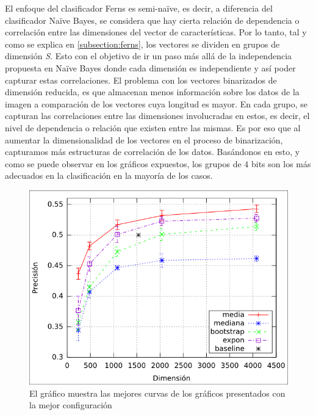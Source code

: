 	El enfoque del clasificador Ferns es semi-na\"{i}ve, es decir, a diferencia del clasificador Na\"{i}ve Bayes, se considera que hay cierta relación de dependencia o correlación entre las dimensiones del vector de características. Por lo tanto, tal y como se explica en \ref{subsection:ferns}, los vectores se dividen en grupos de dimensión \textit{S}. Esto con el objetivo de ir un paso más allá de la independencia propuesta en Na\"{i}ve Bayes donde cada dimensión es independiente y así poder capturar estas correlaciones. El problema con los vectores binarizados de dimensión reducida, es que almacenan menos información sobre los datos de la imagen a comparación de los vectores cuya longitud es mayor. En cada grupo, se capturan las correlaciones entre las dimensiones involucradas en estos, es decir, el nivel de dependencia o relación que existen entre las mismas. Es por eso que al aumentar la dimensionalidad de los vectores en el proceso de binarización, capturamos más estructuras de correlación de los datos. Basándonos en esto, y como se puede observar en los gráficos expuestos, los grupos de $4$ bits son los más adecuados en la clasificación en la mayoría de los casos.

			\begin{figure}[htbp]
				\centering
				\centerline{
					\includegraphics[scale=0.6]{img/resultados/reales/comparativa_metodos.png}
				}
				\caption[Reales comparativa]{El gráfico muestra las mejores curvas de los gráficos presentados con la mejor configuración}
				\label{fig: Reales-Comparativa metodos}
			\end{figure}

